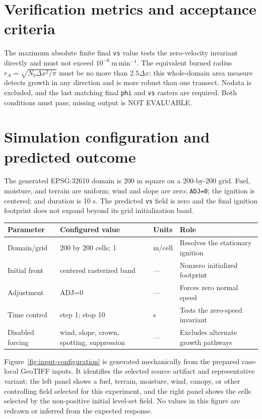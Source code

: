 \section{Verification metrics and acceptance criteria}

The maximum absolute finite final \texttt{vs} value tests the zero-velocity invariant directly and must not exceed \(10^{-6}~\mathrm{m\,min^{-1}}\). The equivalent burned radius \(r_A=\sqrt{N_b\Delta x^2/\pi}\) must be no more than \(2.5\Delta x\); this whole-domain area measure detects growth in any direction and is more robust than one transect. Nodata is excluded, and the last matching final \texttt{phi} and \texttt{vs} rasters are required. Both conditions must pass; missing output is NOT EVALUABLE.

\section{Simulation configuration and predicted outcome}

The generated EPSG:32610 domain is 200 m square on a 200-by-200 grid. Fuel, moisture, and terrain are uniform; wind and slope are zero; \texttt{ADJ=0}; the ignition is centered; and duration is 10 s. The predicted \texttt{vs} field is zero and the final ignition footprint does not expand beyond its grid initialization band.

\begin{center}\begin{tabular}{p{}p{}p{}p{}}\toprule
Parameter & Configured value & Units & Role \\
\midrule Domain/grid & 200 by 200 cells; 1 & m/cell & Resolves the stationary ignition \\
Initial front & centered rasterized band & --- & Nonzero initialized footprint \\
Adjustment & ADJ=0 & --- & Forces zero normal speed \\
Time control & step 1; stop 10 & s & Tests the zero-speed invariant \\
Disabled forcing & wind, slope, crown, spotting, suppression & --- & Excludes alternate growth pathways \\
\bottomrule\end{tabular}\end{center}

Figure~\ref{fig:input-configuration} is generated mechanically from the prepared case-local GeoTIFF inputs. It identifies the selected source artifact and representative variant; the left panel shows a fuel, terrain, moisture, wind, canopy, or other controlling field selected for this experiment, and the right panel shows the cells selected by the non-positive initial level-set field. No values in this figure are redrawn or inferred from the expected response.

